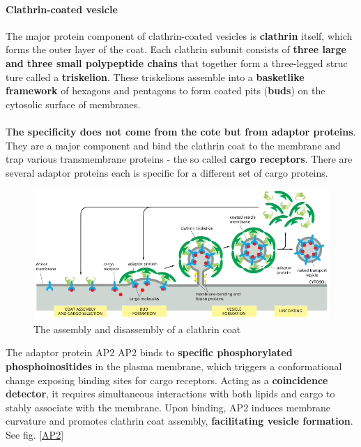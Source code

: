\documentclass[../main.tex]{subfiles}
\begin{document}
\paragraph{Clathrin-coated vesicle}
The major protein component of clathrin-coated vesicles is \textbf{\gls{clathrin}} itself, which forms the outer layer of the coat. Each clathrin subunit consists of \textbf{three large and three small polypeptide chains} that together form a three-legged struc ture called a \textbf{triskelion}. These triskelions assemble into a \textbf{basketlike framework} of hexagons and pentagons to form coated pits (\textbf{buds}) on the cytosolic surface of membranes. \\
\\

T\textbf{he specificity does not come from the cote but from adaptor proteins}. They are a major component and bind the clathrin coat to the membrane and trap various transmembrane proteins - the so called \textbf{cargo receptors}. There are several adaptor proteins each is specific for a different set of cargo proteins. 

\begin{figure}[H]
	\centering
	\includegraphics[width= \textwidth]{7}
	\caption{The assembly and disassembly of a clathrin coat}
\end{figure}


\begin{ExWithTitle}{The adaptor protein AP2}
	\gls{AP2} binds to \textbf{specific phosphorylated phosphoinositides} in the plasma membrane, which triggers a conformational change exposing binding sites for cargo receptors. Acting as a \textbf{coincidence detector}, it requires simultaneous interactions with both lipids and cargo to stably associate with the membrane. Upon binding, AP2 induces membrane curvature and promotes clathrin coat assembly, \textbf{facilitating vesicle formation}. See fig. \ref{AP2} 
\end{ExWithTitle}
\end{document}
